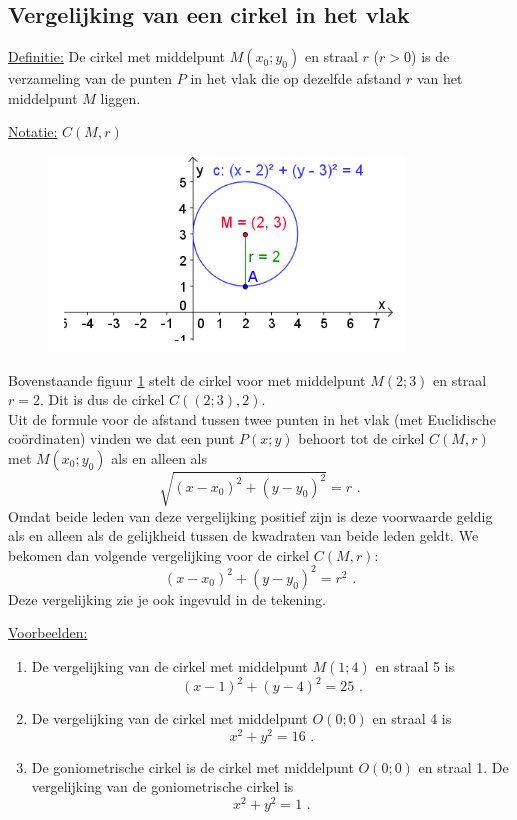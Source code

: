 
\subsection{Vergelijking van een cirkel in het vlak}
\noindent

\noindent \underline{Definitie:} De cirkel met middelpunt $M(x_0;y_0)$ en straal $r$ ($r>0$) is de verzameling van de punten $P$ in het vlak die op dezelfde afstand $r$ van het middelpunt $M$ liggen.

\noindent \underline{Notatie:} $C(M,r)$
\begin{figure}[h]
\begin{center}
\includegraphics[height=5 cm]{4_opp_inhoud_an_meetk/inputs/AMTekst7Fig1}
\caption{}
\label{fig4.2.15_fig1}
\end{center}
\end{figure}

\noindent Bovenstaande figuur \ref{fig4.2.15_fig1} stelt de cirkel voor met middelpunt $M(2;3)$ en straal $r=2$.
Dit is dus de cirkel $C((2;3),2)$.\\

Uit de formule voor de afstand tussen twee punten in het vlak (met Euclidische co\"ordinaten) vinden we dat een punt $P(x;y)$ behoort tot de cirkel $C(M,r)$ met $M(x_0;y_0)$ als en alleen als
\[
\sqrt {(x-x_0)^2+(y-y_0)^2}=r \text { .}
\]
Omdat beide leden van deze vergelijking positief zijn is deze voorwaarde geldig als en alleen als de gelijkheid tussen de kwadraten van beide leden geldt.
We bekomen dan volgende vergelijking voor de cirkel $C(M,r)$:
\[
(x-x_0)^2+(y-y_0)^2=r^2 \text { .}
\]
Deze vergelijking zie je ook ingevuld in de tekening.

\noindent \underline{Voorbeelden:}
\begin{enumerate}
\item De vergelijking van de cirkel met middelpunt $M(1;4)$ en straal 5 is
\[
(x-1)^2+(y-4)^2=25 \text { .}
\]
\item De vergelijking van de cirkel met middelpunt $O(0;0)$ en straal 4 is
\[
x^2+y^2=16 \text { .}
\]
\item De goniometrische cirkel is de cirkel met middelpunt $O(0;0)$ en straal 1.
De vergelijking van de goniometrische cirkel is
\[
x^2+y^2=1 \text { .}
\]
\end{enumerate}

